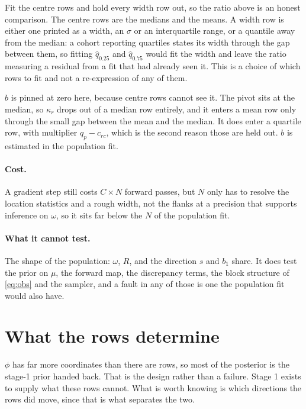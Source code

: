 \documentclass[11pt]{article}
\begin{document}
Fit the centre rows and hold every width row out, so the ratio above is an
honest comparison. The centre rows are the medians and the means. A width row is
either one printed as a width, an $\sigma$ or an interquartile range, or a
quantile away from the median: a cohort reporting quartiles states its width
through the gap between them, so fitting $\hat q_{0.25}$ and $\hat q_{0.75}$
would fit the width and leave the ratio measuring a residual from a fit that had
already seen it. This is a choice of which rows to fit and not a re-expression of
any of them.

$b$ is pinned at zero here, because centre rows cannot see it. The pivot sits at
the median, so $\kappa_r$ drops out of a median row entirely, and it enters a
mean row only through the small gap between the mean and the median. It does
enter a quartile row, with multiplier $\hat q_p-c_{rc}$, which is the second
reason those are held out. $b$ is estimated in the population fit.

\paragraph{Cost.} A gradient step still costs $C\times N$ forward passes, but $N$
only has to resolve the location statistics and a rough width, not the flanks at
a precision that supports inference on $\omega$, so it sits far below the $N$ of
the population fit.

\paragraph{What it cannot test.} The shape of the population: $\omega$, $R$, and
the direction $s$ and $b_1$ share. It does test the prior on $\mu$, the forward
map, the discrepancy terms, the block structure of \eqref{eq:obs} and the
sampler, and a fault in any of those is one the population fit would also have.

\section{What the rows determine}
\label{sec:determined}

$\phi$ has far more coordinates than there are rows, so most of the posterior is
the stage-1 prior handed back. That is the design rather than a failure. Stage 1
exists to supply what these rows cannot. What is worth knowing is which
directions the rows did move, since that is what separates the two.
\end{document}
